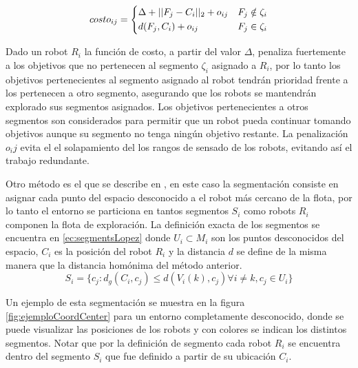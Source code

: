 \begin{equation}\label{ec:costsolanas}
costo_{ij} = 
\begin{dcases}
  \Delta + || F_j - C_i ||_2 + o_{ij} & F_j \notin \zeta_i \\
  d(F_j, C_i) + o_{ij}                & F_j \in    \zeta_i
\end{dcases}
\end{equation}

Dado un robot $R_i$ la función de costo, a partir del valor $\Delta$, penaliza fuertemente a los objetivos que no pertenecen al segmento $\zeta_i$ asignado a $R_i$, por lo tanto los objetivos pertenecientes al segmento asignado al robot tendrán prioridad frente a los pertenecen a otro segmento, asegurando que los robots se mantendrán explorado sus segmentos asignados. Los objetivos pertenecientes a otros segmentos son considerados para permitir que un robot pueda continuar tomando objetivos aunque su segmento no tenga ningún objetivo restante. La penalización $o_ij$ evita el el solapamiento del los rangos de sensado de los robots, evitando así el trabajo redundante.\medbreak

Otro método es el que se describe en \cite{Lopez-Perez2018}, en este caso la segmentación consiste en asignar cada punto del espacio desconocido a el robot más cercano de la flota, por lo tanto el entorno se particiona en tantos segmentos $S_i$ como robots $R_i$ componen la flota de exploración. La definición exacta de los segmentos se encuentra en \eqref{ec:segmentsLopez} donde $U_i \subset M_i$ son los puntos desconocidos del espacio, $C_i$ es la posición del robot $R_i$ y la distancia $d$ se define de la misma manera que la distancia homónima del método anterior.
\begin{equation}\label{ec:segmentsLopez}
  S_i=\{c_j:d_g(C_i,c_j)\leq d(V_i(k),c_j) \forall i \neq k , c_j \in U_i\}
\end{equation}


Un ejemplo de esta segmentación se muestra en la figura \ref{fig:ejemploCoordCenter} para un entorno completamente desconocido, donde se puede visualizar las posiciones de los robots y con colores se indican los distintos segmentos. Notar que por la definición de segmento cada robot $R_i$ se encuentra dentro del segmento $S_i$ que fue definido a partir de su ubicación $C_i$. %

